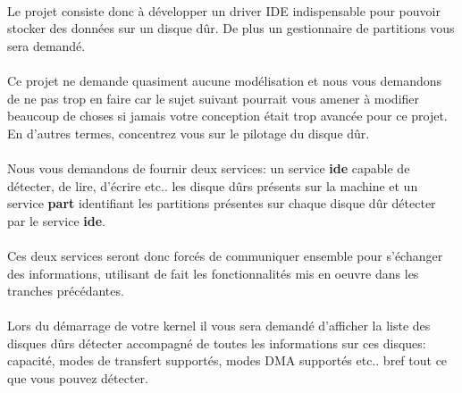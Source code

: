 \documentclass[10pt,a4wide]{article}
\begin{document}
\paragraph{}

Le projet consiste donc \`a d\'evelopper un driver IDE indispensable pour
pouvoir stocker des donn\'ees sur un disque d\^ur. De plus un gestionnaire
de partitions vous sera demand\'e.

\paragraph{}

Ce projet ne demande quasiment aucune mod\'elisation et nous vous demandons
de ne pas trop en faire car le sujet suivant pourrait vous amener \`a modifier
beaucoup de choses si jamais votre conception \'etait trop avanc\'ee pour
ce projet. En d'autres termes, concentrez vous sur le pilotage du disque
d\^ur.

\paragraph{}

Nous vous demandons de fournir deux services: un service \textbf{ide} capable
de d\'etecter, de lire, d'\'ecrire etc.. les disque d\^urs pr\'esents
sur la machine et un service \textbf{part} identifiant les partitions
pr\'esentes sur chaque disque d\^ur d\'etecter par le service \textbf{ide}.

\paragraph{}

Ces deux services seront donc forc\'es de communiquer ensemble pour
s'\'echanger des informations, utilisant de fait les fonctionnalit\'es
mis en oeuvre dans les tranches pr\'ec\'edantes.

\paragraph{}

Lors du d\'emarrage de votre kernel il vous sera demand\'e d'afficher
la liste des disques d\^urs d\'etecter accompagn\'e de toutes les
informations sur ces disques: capacit\'e, modes de transfert support\'es,
modes DMA support\'es etc.. bref tout ce que vous pouvez d\'etecter.

\paragraph{}
\end{document}
